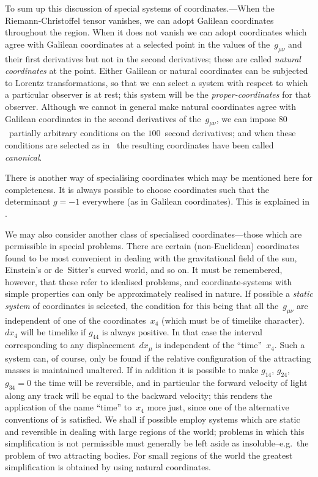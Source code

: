 \documentclass[12pt]{book}
\begin{document}
To sum up this discussion of special systems of coordinates.---When the
Riemann\hyp{}Christoffel tensor vanishes, we can adopt Galilean coordinates
throughout the region. When it does not vanish we can adopt coordinates
which agree with Galilean coordinates at a selected point in the values of the~$g_{\mu\nu}$
and their first derivatives but not in the second derivatives; these are
called \emph{natural coordinates} at the point. Either Galilean or natural coordinates
can be subjected to Lorentz transformations, so that we can select a system
with respect to which a particular observer is at rest; this system will be the
\emph{proper\hyp{}coordinates} for that observer. Although we cannot in general make
%
natural coordinates agree with Galilean coordinates in the second derivatives
of the~$g_{\mu\nu}$, we can impose $80$~partially arbitrary conditions on the $100$~second
derivatives; and when these conditions are selected as in~ the resulting
coordinates have been called \emph{canonical}.

There is another way of specialising coordinates which may be mentioned
here for completeness. It is always possible to choose coordinates such that
the determinant $g = -1$ everywhere (as in Galilean coordinates). This is
explained in .

We may also consider another class of specialised coordinates---those
which are permissible in special problems. There are certain (non\hyp{}Euclidean)
coordinates found to be most convenient in dealing with the gravitational
field of the sun, Einstein's or de~Sitter's curved world, and so on. It must be
remembered, however, that these refer to idealised problems, and coordinate\hyp{}systems
%
%
with simple properties can only be approximately realised in nature.
%
%
If possible a \emph{static system} of coordinates is selected, the condition for this
being that all the~$g_{\mu\nu}$ are independent of one of the coordinates~$x_{4}$ (which
must be of timelike character\footnotemark).\footnotetext
  {$dx_{4}$ will be timelike if $g_{44}$ is always positive.}
In that case the interval corresponding to
any displacement~$dx_{\mu}$ is independent of the ``time''~$x_{4}$. Such a system can,
of course, only be found if the relative configuration of the attracting masses
is maintained unaltered. If in addition it is possible to make $g_{14}$, $g_{24}$, $g_{34} = 0$
the time will be reversible, and in particular the forward velocity of light
along any track will be equal to the backward velocity; this renders the
application of the name ``time'' to~$x_{4}$ more just, since one of the alternative
conventions of  is satisfied. We shall if possible employ systems which
are static and reversible in dealing with large regions of the world; problems
in which this simplification is not permissible must generally be left aside as
insoluble--e.g.\ the problem of two attracting bodies. For small regions of the
world the greatest simplification is obtained by using natural coordinates.
\end{document}

